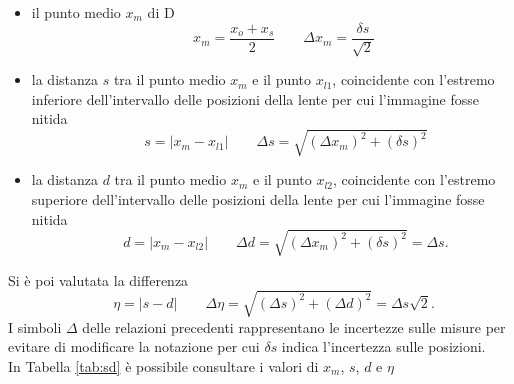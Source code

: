 \documentclass[11pt,a4paper]{article}
\begin{document}
\begin{itemize}
    \item il punto medio $x_m$ di D
    \begin{equation}
    \qquad{x_m = \frac{x_o + x_s}{2}}
    \qquad{\Delta x_m = \frac{\delta s}{\sqrt{2}}} \;
    \end{equation}
    
    \item la distanza $s$ tra il punto medio $x_m$ e il punto $x_{l1}$, coincidente con l'estremo inferiore dell'intervallo delle posizioni della lente per cui l'immagine fosse nitida
    \begin{equation}
        \qquad{s = |x_m - x_{l1}|}
        \qquad{\Delta s = \sqrt{(\Delta x_m)^2 + (\delta s)^2}}
    \end{equation}

    \item la distanza $d$ tra il punto medio $x_m$ e il punto $x_{l2}$, coincidente con l'estremo superiore dell'intervallo delle posizioni della lente per cui l'immagine fosse nitida
    \begin{equation}
        \qquad{d = |x_m - x_{l2}|}
        \qquad{\Delta d = \sqrt{(\Delta x_m)^2 + (\delta s)^2} = \Delta s}.
    \end{equation}
\end{itemize}
Si è poi valutata la differenza
\begin{equation}
    \qquad{\eta = |s-d|}
    \qquad{\Delta \eta = \sqrt{(\Delta s)^2 + (\Delta d)^2}} = \Delta s \sqrt{2}.
\end{equation}
I simboli $\Delta$ delle relazioni precedenti rappresentano le incertezze sulle misure per evitare di modificare la notazione per cui $\delta s$ indica l'incertezza sulle posizioni.
\\
In Tabella \ref{tab:sd} è possibile consultare i valori di $x_m$, $s$, $d$ e $\eta$
\end{document}
